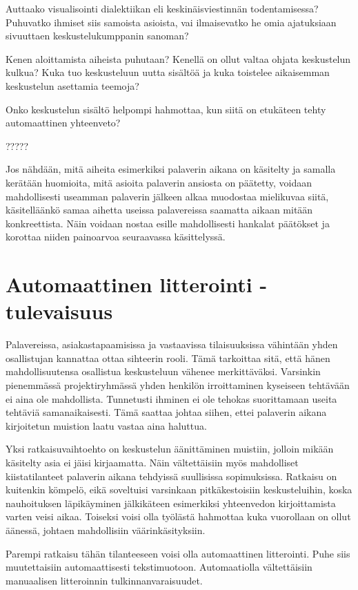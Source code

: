 \documentclass[11pt,a4paper,oneside]{memoir}
\begin{document}
Auttaako visualisointi dialektiikan eli keskinäisviestinnän todentamisessa? Puhuvatko ihmiset siis samoista asioista, vai ilmaisevatko he omia ajatuksiaan sivuuttaen keskustelukumppanin sanoman?

Kenen aloittamista aiheista puhutaan? Kenellä on ollut valtaa ohjata keskustelun kulkua? Kuka tuo keskusteluun uutta sisältöä ja kuka toistelee aikaisemman keskustelun asettamia teemoja?

Onko keskustelun sisältö helpompi hahmottaa, kun siitä on etukäteen tehty automaattinen yhteenveto?

?????

Jos nähdään, mitä aiheita esimerkiksi palaverin aikana on käsitelty ja samalla kerätään huomioita, mitä asioita palaverin ansiosta on päätetty, voidaan mahdollisesti useamman palaverin jälkeen alkaa muodostaa mielikuvaa siitä, käsitelläänkö samaa aihetta useissa palavereissa saamatta aikaan mitään konkreettista. Näin voidaan nostaa esille mahdollisesti hankalat päätökset ja korottaa niiden painoarvoa seuraavassa käsittelyssä.

\chapter{Automaattinen litterointi - tulevaisuus}
Palavereissa, asiakastapaamisissa ja vastaavissa tilaisuuksissa vähintään yhden osallistujan kannattaa ottaa sihteerin rooli. Tämä tarkoittaa sitä, että hänen mahdollisuutensa osallistua keskusteluun vähenee merkittäväksi. Varsinkin pienemmässä projektiryhmässä yhden henkilön irroittaminen kyseiseen tehtävään ei aina ole mahdollista. Tunnetusti ihminen ei ole tehokas suorittamaan useita tehtäviä samanaikaisesti. Tämä saattaa johtaa siihen, ettei palaverin aikana kirjoitetun muistion laatu vastaa aina haluttua.

Yksi ratkaisuvaihtoehto on keskustelun äänittäminen muistiin, jolloin mikään käsitelty asia ei jäisi kirjaamatta. Näin vältettäisiin myös mahdolliset kiistatilanteet palaverin aikana tehdyissä suullisissa sopimuksissa. Ratkaisu on kuitenkin kömpelö, eikä soveltuisi varsinkaan pitkäkestoisiin keskusteluihin, koska nauhoituksen läpikäyminen jälkikäteen esimerkiksi yhteenvedon kirjoittamista varten veisi aikaa. Toiseksi voisi olla työlästä hahmottaa kuka vuorollaan on ollut äänessä, johtaen mahdollisiin väärinkäsityksiin.

Parempi ratkaisu tähän tilanteeseen voisi olla automaattinen litterointi. Puhe siis muutettaisiin automaattisesti tekstimuotoon. Automaatiolla vältettäisiin manuaalisen litteroinnin tulkinnanvaraisuudet.
\end{document}
